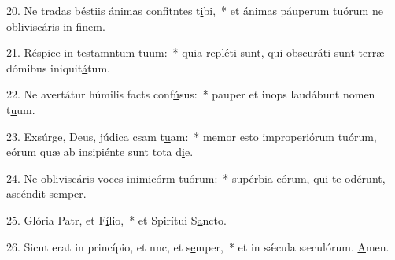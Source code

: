 20. Ne tradas béstiis ánimas confitntes t\uline{i}bi,~* et ánimas páuperum tuórum ne obliviscáris in f\uline{i}nem.\par 
21. Réspice in testamntum t\uline{u}um:~* quia repléti sunt, qui obscuráti sunt terræ dómibus iniquit\uline{á}tum.\par 
22. Ne avertátur húmilis facts conf\uline{ú}sus:~* pauper et inops laudábunt nomen t\uline{u}um.\par 
23. Exsúrge, Deus, júdica csam t\uline{u}am:~* memor esto improperiórum tuórum, eórum quæ ab insipiénte sunt tota d\uline{i}e.\par 
24. Ne obliviscáris voces inimicórm tu\uline{ó}rum:~* supérbia eórum, qui te odérunt, ascéndit s\uline{e}mper.\par 
25. Glória Patr, et F\uline{í}lio,~* et Spirítui S\uline{a}ncto.\par 
26. Sicut erat in princípio, et nnc, et s\uline{e}mper,~* et in sǽcula sæculórum. \uline{A}men.\par 
